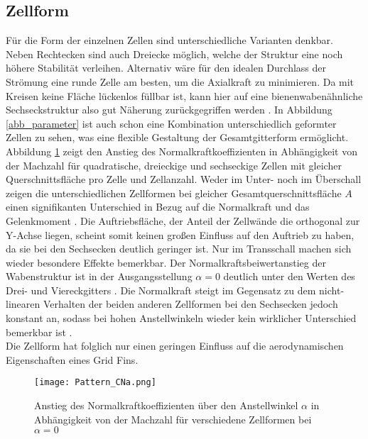 \subsection{Zellform}
Für die Form der einzelnen Zellen sind unterschiedliche Varianten denkbar. Neben Rechtecken sind auch Dreiecke möglich, welche der Struktur eine noch höhere Stabilität verleihen. Alternativ wäre für den idealen Durchlass der Strömung eine runde Zelle am besten, um die Axialkraft zu minimieren. Da mit Kreisen keine Fläche lückenlos füllbar ist, kann hier auf eine bienenwabenähnliche Sechseckstruktur also gut Näherung zurückgegriffen werden \cite{Pattern}. In Abbildung \ref{abb_parameter} ist auch schon eine Kombination unterschiedlich geformter Zellen zu sehen, was eine flexible Gestaltung der Gesamtgitterform ermöglicht.\\
Abbildung \ref{abb_Form-Cn} zeigt den Anstieg des Normalkraftkoeffizienten in Abhängigkeit von der Machzahl für quadratische, dreieckige und sechseckige Zellen mit gleicher Querschnittsfläche pro Zelle und Zellanzahl.
Weder im Unter- noch im Überschall zeigen die unterschiedlichen Zellformen bei gleicher Gesamtquerschnittsfläche $A$ einen signifikanten Unterschied in Bezug auf die Normalkraft und das Gelenkmoment \cite{Pattern}. Die Auftriebsfläche, der Anteil der Zellwände die orthogonal zur Y-Achse liegen, scheint somit keinen großen Einfluss auf den Auftrieb zu haben, da sie bei den Sechsecken deutlich geringer ist. Nur im Transschall machen sich wieder besondere Effekte bemerkbar. Der Normalkraftsbeiwertanstieg der Wabenstruktur ist in der Ausgangsstellung $\alpha = 0$ deutlich unter den Werten des Drei- und Viereckgitters \cite{Pattern}. Die Normalkraft steigt im Gegensatz zu dem nicht-linearen Verhalten der beiden anderen Zellformen bei den Sechsecken jedoch konstant an, sodass bei hohen Anstellwinkeln wieder kein wirklicher Unterschied bemerkbar ist \cite{Pattern}.\\
Die Zellform hat folglich nur einen geringen Einfluss auf die aerodynamischen Eigenschaften eines Grid Fins.
\begin{figure}[h]
	\centering
	\texttt{[image: Pattern\_CNa.png]}
	\caption{Anstieg des Normalkraftkoeffizienten über den Anstellwinkel $\alpha$ in Abhängigkeit von der Machzahl für verschiedene Zellformen bei $\alpha = 0$}
	\label{abb_Form-Cn}
\end{figure}
